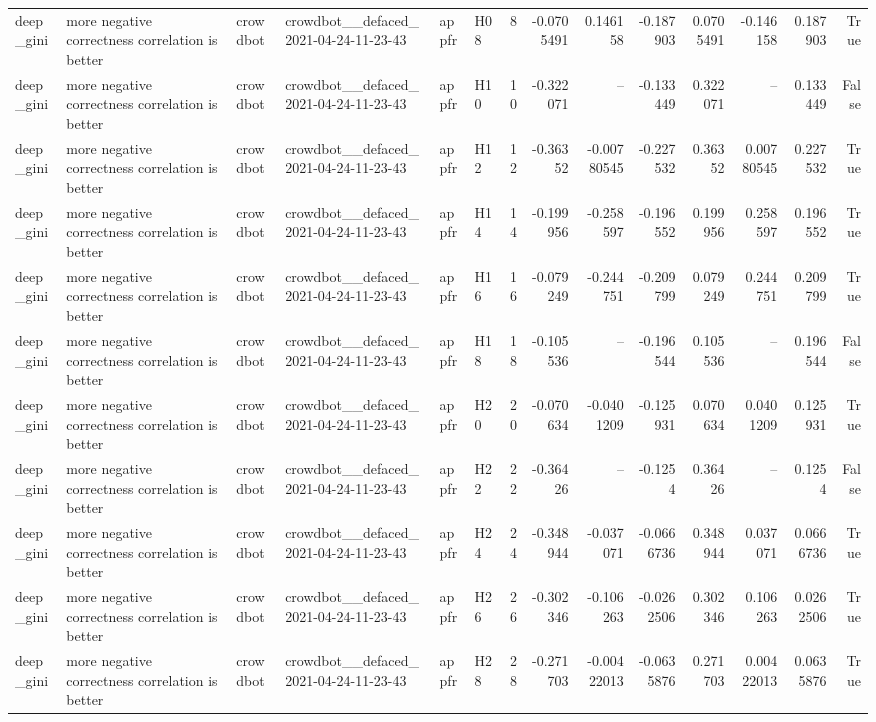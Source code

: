 \begin{longtable}{llllllrrrrrrrr}
deep\_gini & more negative correctness correlation is better & crowdbot & crowdbot\_\_defaced\_2021-04-24-11-23-43 & appfr & H08 & 8 & -0.0705491 & 0.146158 & -0.187903 & 0.0705491 & -0.146158 & 0.187903 & True \\
deep\_gini & more negative correctness correlation is better & crowdbot & crowdbot\_\_defaced\_2021-04-24-11-23-43 & appfr & H10 & 10 & -0.322071 & -- & -0.133449 & 0.322071 & -- & 0.133449 & False \\
deep\_gini & more negative correctness correlation is better & crowdbot & crowdbot\_\_defaced\_2021-04-24-11-23-43 & appfr & H12 & 12 & -0.36352 & -0.00780545 & -0.227532 & 0.36352 & 0.00780545 & 0.227532 & True \\
deep\_gini & more negative correctness correlation is better & crowdbot & crowdbot\_\_defaced\_2021-04-24-11-23-43 & appfr & H14 & 14 & -0.199956 & -0.258597 & -0.196552 & 0.199956 & 0.258597 & 0.196552 & True \\
deep\_gini & more negative correctness correlation is better & crowdbot & crowdbot\_\_defaced\_2021-04-24-11-23-43 & appfr & H16 & 16 & -0.079249 & -0.244751 & -0.209799 & 0.079249 & 0.244751 & 0.209799 & True \\
deep\_gini & more negative correctness correlation is better & crowdbot & crowdbot\_\_defaced\_2021-04-24-11-23-43 & appfr & H18 & 18 & -0.105536 & -- & -0.196544 & 0.105536 & -- & 0.196544 & False \\
deep\_gini & more negative correctness correlation is better & crowdbot & crowdbot\_\_defaced\_2021-04-24-11-23-43 & appfr & H20 & 20 & -0.070634 & -0.0401209 & -0.125931 & 0.070634 & 0.0401209 & 0.125931 & True \\
deep\_gini & more negative correctness correlation is better & crowdbot & crowdbot\_\_defaced\_2021-04-24-11-23-43 & appfr & H22 & 22 & -0.36426 & -- & -0.1254 & 0.36426 & -- & 0.1254 & False \\
deep\_gini & more negative correctness correlation is better & crowdbot & crowdbot\_\_defaced\_2021-04-24-11-23-43 & appfr & H24 & 24 & -0.348944 & -0.037071 & -0.0666736 & 0.348944 & 0.037071 & 0.0666736 & True \\
deep\_gini & more negative correctness correlation is better & crowdbot & crowdbot\_\_defaced\_2021-04-24-11-23-43 & appfr & H26 & 26 & -0.302346 & -0.106263 & -0.0262506 & 0.302346 & 0.106263 & 0.0262506 & True \\
deep\_gini & more negative correctness correlation is better & crowdbot & crowdbot\_\_defaced\_2021-04-24-11-23-43 & appfr & H28 & 28 & -0.271703 & -0.00422013 & -0.0635876 & 0.271703 & 0.00422013 & 0.0635876 & True \\

\end{longtable}
